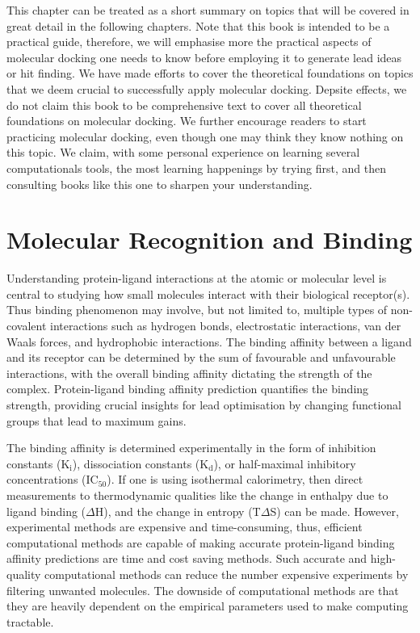 This chapter can be treated as a short summary on topics that will be covered in great detail in the following chapters. Note that this book is intended to be a practical guide, therefore, we will emphasise more the practical aspects of molecular docking one needs to know before employing it to generate lead ideas or hit finding. We have made efforts to cover the theoretical foundations on topics that we deem crucial to successfully apply molecular docking. Depsite effects, we do not claim this book to be comprehensive text to cover all theoretical foundations on molecular docking. We further encourage readers to start practicing molecular docking, even though one may think they know nothing on this topic. We claim, with some personal experience on learning several computationals tools, the most learning happenings by trying first, and then consulting books like this one to sharpen your understanding. 

\section{Molecular Recognition and Binding}
Understanding protein-ligand interactions at the atomic or molecular level is central to studying how small molecules interact with their biological receptor(s). Thus binding phenomenon may involve, but not limited to, multiple types of non-covalent interactions such as hydrogen bonds, electrostatic interactions, van der Waals forces, and hydrophobic interactions. The binding affinity between a ligand and its receptor can be determined by the sum of favourable and unfavourable interactions, with the overall binding affinity dictating the strength of the complex. Protein-ligand binding affinity prediction quantifies the binding strength, providing crucial insights for lead optimisation by changing functional groups that lead to maximum gains\cite{CH1_13}. 

The binding affinity is determined experimentally in the form of inhibition constants (K$_\text{i}$), dissociation constants (K$_\text{d}$), or half-maximal inhibitory concentrations (IC$_\text{50}$). If one is using isothermal calorimetry, then direct measurements to thermodynamic qualities like the change in enthalpy due to ligand binding ({$\Delta$}H), and the change in entropy (T{$\Delta$}S) can be made. However, experimental methods are expensive and time-consuming, thus, efficient computational methods are capable of making accurate protein-ligand binding affinity predictions are time and cost saving methods. Such accurate and high-quality computational methods can reduce the number expensive experiments by filtering unwanted molecules. The downside of computational methods are that they are heavily dependent on the empirical parameters used to make computing tractable.

